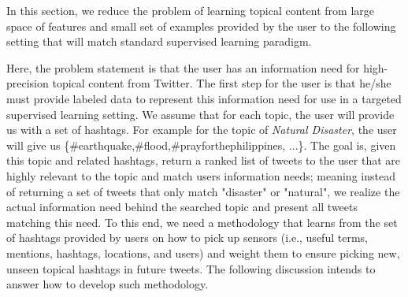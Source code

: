 



{\color{red}
In this section, we reduce the problem of learning topical content from large space of features and small set of examples provided by the user to the following setting that will match standard supervised learning paradigm.

Here, the problem statement is that the user has an information need for high-precision topical content from Twitter. 
The first step for the user is that he/she must provide labeled data to represent this information need for use in a targeted supervised learning setting.
 We assume that for each topic, the user will provide us with a set of hashtags. For example for the topic of \textit{Natural Disaster}, 
the user will give us \{\#earthquake,\#flood,\#prayforthephilippines, ...\}. The goal is, given this topic and related hashtags, return a ranked
 list of tweets to the user that are highly relevant to the topic and match users information needs; meaning instead of returning a set of tweets
 that only match "disaster" or "natural", we realize the actual information need behind the searched topic and present all tweets matching this need. 
To this end, we need a methodology that learns from the set of hashtags provided by users on how to pick up sensors (i.e., useful terms, mentions, 
hashtags, locations, and users) and weight them to ensure picking new, unseen topical hashtags in future tweets. The following discussion intends
 to answer how to develop such methodology. %
 }
 

